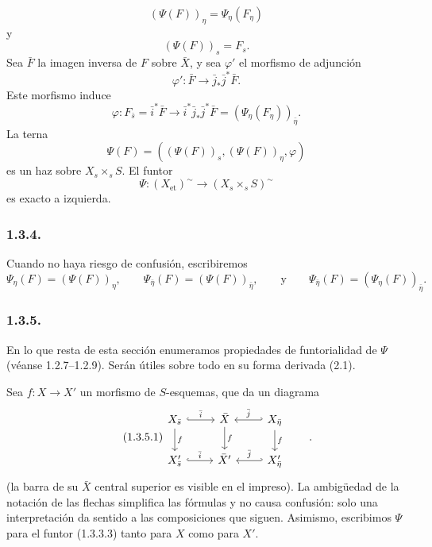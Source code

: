 \begin{equation}\tag{1.3.3.1}
(\Psi(F))_\eta=\Psi_\eta(F_\eta)
\end{equation}
y
\begin{equation}\tag{1.3.3.2}
(\Psi(F))_s=F_s.
\end{equation}
Sea $\bar F$ la imagen inversa de $F$ sobre $\bar X$, y sea $\varphi'$ el
morfismo de adjunción
\begin{equation*}
\varphi':\bar F\longrightarrow\bar j_*\bar j^*\bar F.
\end{equation*}
Este morfismo induce
\begin{equation*}
\varphi:F_{\bar s}=\bar i^*\bar F
\longrightarrow
\bar i^*\bar j_*\bar j^*\bar F
=(\Psi_\eta(F_\eta))_{\bar\eta}.
\end{equation*}
La terna
\begin{equation*}
\Psi(F)=((\Psi(F))_s,(\Psi(F))_\eta,\varphi)
\end{equation*}
es un haz sobre $X_s\times_sS$. El funtor
\begin{equation}\tag{1.3.3.3}
\Psi:(X_{\mathrm{et}})^{\sim}
\longrightarrow(X_s\times_sS)^{\sim}
\end{equation}
es exacto a izquierda.

\subsubsection*{1.3.4.}
Cuando no haya riesgo de confusión, escribiremos
\begin{equation*}
\Psi_\eta(F)=(\Psi(F))_\eta,
\qquad
\Psi_{\bar\eta}(F)=(\Psi(F))_{\bar\eta},
\qquad\text{y}\qquad
\Psi_{\bar\eta}(F)=(\Psi_\eta(F))_{\bar\eta}.
\end{equation*}

\subsubsection*{1.3.5.}
En lo que resta de esta sección enumeramos propiedades de funtorialidad de
$\Psi$ (véanse 1.2.7--1.2.9). Serán útiles sobre todo en su forma derivada
(2.1).

Sea $f:X\longrightarrow X'$ un morfismo de $S$-esquemas, que da un diagrama
\begin{equation}\tag{1.3.5.1}
\begin{tikzcd}
X_{\bar s} \arrow[r, hook, "\bar i"] \arrow[d, "f"]
  & \sisi{X}{\bar X} \arrow[d, "f"]
  & X_{\bar\eta} \arrow[l, hook', "\bar j"'] \arrow[d, "f"] \\
X'_{\bar s} \arrow[r, hook, "\bar i"]
  & \bar X' & X'_{\bar\eta} \arrow[l, hook', "\bar j"']
\end{tikzcd}
\qquad .
\end{equation}
(la barra de su $\bar X$ central superior es visible en el impreso). La
ambigüedad de la notación de las flechas simplifica las fórmulas
y no causa confusión: solo una interpretación da sentido a las composiciones
que siguen. Asimismo, escribimos $\Psi$ para el funtor (1.3.3.3) tanto para
$X$ como para $X'$.

